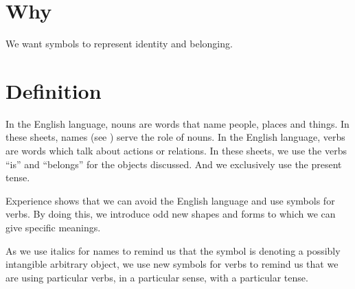 

\section*{Why}

We want symbols to represent identity and belonging.


\section*{Definition}

In the English language, nouns are words that name people, places and things.
In these sheets, names (see ) serve the role of nouns.
In the English language, verbs are words which talk about actions or relations.
In these sheets, we use the verbs ``is'' and ``belongs'' for the objects discussed.
And we exclusively use the present tense.


Experience shows that we can avoid the English language and use symbols for verbs.
By doing this, we introduce odd new shapes and forms to which we can give specific meanings.
%  

As we use italics for names to remind us that the symbol is denoting a possibly intangible arbitrary object, we use new symbols for verbs to remind us that we are using particular verbs, in a particular sense, with a particular tense.
%  

